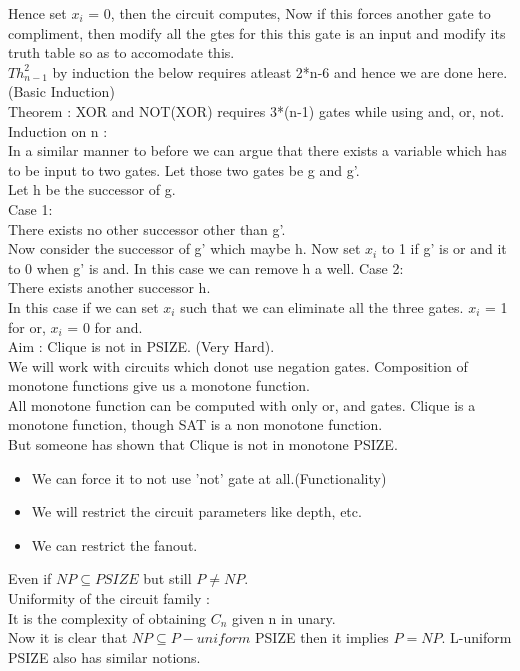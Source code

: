 \documentclass[solution,addpoints,12pt]{exam}
\begin{document}
Hence set $x_i$ = 0, then the circuit computes,
Now if this forces another gate to compliment, then modify
all the gtes for this this gate is an input and modify its
truth table so as to accomodate this.\\
$Th_{n-1}^{2}$ by induction the below
requires atleast 2*n-6 and hence we are done here. (Basic Induction)\\

Theorem : XOR and NOT(XOR) requires 3*(n-1) gates while using and, or, not.\\
Induction on n :\\
In a similar manner to before we can argue that there
exists a variable which has to be input to two gates. Let
those two gates be g and g'.\\
Let h be the successor of g.\\
Case 1:\\
There exists no other successor other than g'.\\
Now consider the successor of g' which maybe h.
Now set $x_i$ to 1 if g' is or and it to 0 when g' is and.
In this case we can remove h a well.
Case 2:\\
There exists another successor h.\\
In this case if we can set
$x_i$ such that we can eliminate all the three gates.
$x_i$ = 1 for or, $x_i$ = 0 for and.\\

Aim : Clique is not in PSIZE. (Very Hard).\\
We will work with circuits which donot use negation gates.
Composition of monotone functions give us a monotone function.\\
All monotone function can be computed with only or, and gates.
Clique is a monotone function, though SAT is a non monotone function.\\
But someone has shown that Clique is not in monotone PSIZE.\\
\begin{itemize}
\item We can force it to not use 'not' gate at all.(Functionality)
\item We will restrict the circuit parameters like depth, etc.
\item We can restrict the fanout.
\end{itemize}
Even if $NP \subseteq PSIZE$ but still $P \neq NP$.\\

Uniformity of the circuit family :\\
It is the complexity of obtaining $C_n$ given n in unary.\\
Now it is clear that $NP \subseteq P-uniform$ PSIZE then it implies
$P = NP$. L-uniform PSIZE also has similar notions.\\
\end{document}

